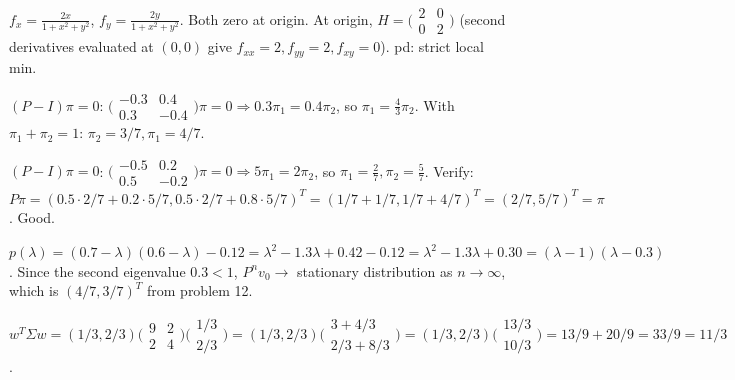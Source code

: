 \begin{solutions}
  \item $f_{x} = \tfrac{2 x}{1 + x^{2} + y^{2}}$,
        $f_{y} = \tfrac{2 y}{1 + x^{2} + y^{2}}$. Both zero at origin. At
        origin,
        $H = \bigl(\begin{smallmatrix} 2 & 0 \\ 0 & 2 \end{smallmatrix}\bigr)$
        (second derivatives evaluated at $(0,0)$ give
        $f_{xx} = 2, f_{yy} = 2, f_{xy} = 0$). pd: strict local min.

  \item $(P - I)\pi = 0$:
        $\bigl(\begin{smallmatrix} -0.3 & 0.4 \\ 0.3 & -0.4 \end{smallmatrix}\bigr)\pi = 0 \Rightarrow 0.3 \pi_{1} = 0.4 \pi_{2}$,
        so $\pi_{1} = \tfrac{4}{3} \pi_{2}$. With $\pi_{1} + \pi_{2} = 1$:
        $\pi_{2} = 3/7, \pi_{1} = 4/7$.

  \item $(P - I)\pi = 0$:
        $\bigl(\begin{smallmatrix} -0.5 & 0.2 \\ 0.5 & -0.2 \end{smallmatrix}\bigr)\pi = 0 \Rightarrow 5 \pi_{1} = 2 \pi_{2}$,
        so $\pi_{1} = \tfrac{2}{7}, \pi_{2} = \tfrac{5}{7}$. Verify:
        $P \pi = (0.5 \cdot 2/7 + 0.2 \cdot 5/7, 0.5 \cdot 2/7 + 0.8 \cdot 5/7)^{T} = (1/7 + 1/7, 1/7 + 4/7)^{T} = (2/7, 5/7)^{T} = \pi$.
        Good.

  \item $p(\lambda) = (0.7 - \lambda)(0.6 - \lambda) - 0.12 = \lambda^{2} - 1.3 \lambda + 0.42 - 0.12 = \lambda^{2} - 1.3 \lambda + 0.30 = (\lambda - 1)(\lambda - 0.3)$.
        Since the second eigenvalue $0.3 < 1$, $P^{n} v_{0} \to $
        stationary distribution as $n \to \infty$, which is
        $(4/7, 3/7)^{T}$ from problem 12.

  \item $w^{T} \Sigma w = (1/3, 2/3)\bigl(\begin{smallmatrix} 9 & 2 \\ 2 & 4 \end{smallmatrix}\bigr)\bigl(\begin{smallmatrix} 1/3 \\ 2/3 \end{smallmatrix}\bigr) = (1/3, 2/3)\bigl(\begin{smallmatrix} 3 + 4/3 \\ 2/3 + 8/3 \end{smallmatrix}\bigr) = (1/3, 2/3)\bigl(\begin{smallmatrix} 13/3 \\ 10/3 \end{smallmatrix}\bigr) = 13/9 + 20/9 = 33/9 = 11/3$.


\end{solutions}
